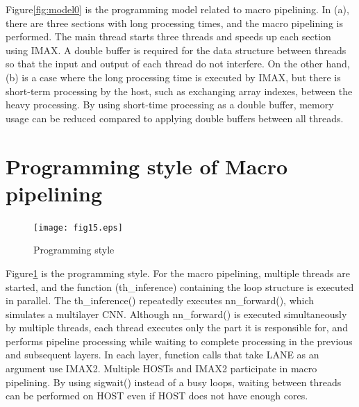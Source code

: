 Figure\ref{fig:model0} is the programming model related to macro pipelining. 
In (a), there are three sections with long processing times, and the macro
pipelining is performed. The main thread starts three threads and speeds up
each section using IMAX. A double buffer is required for the data structure
between threads so that the input and output of each thread do not
interfere. On the other hand, (b) is a case where the long processing time
is executed by IMAX, but there is short-term processing by the host, such as
exchanging array indexes, between the heavy processing. By using short-time
processing as a double buffer, memory usage can be reduced compared to
applying double buffers between all threads.

\section{Programming style of Macro pipelining}

\begin{figure}[htbp]
\center
\texttt{[image: fig15.eps]}
\caption{\label{fig:model1}Programming style}
\end{figure}

Figure\ref{fig:model1} is the programming style. For the macro pipelining,
multiple threads are started, and the function (th\_inference) containing
the loop structure is executed in parallel. The th\_inference() repeatedly
executes nn\_forward(), which simulates a multilayer CNN. Although
nn\_forward() is executed simultaneously by multiple threads, each thread
executes only the part it is responsible for, and performs pipeline
processing while waiting to complete processing in the previous and
subsequent layers. In each layer, function calls that take LANE as an
argument use IMAX2. Multiple HOSTs and IMAX2 participate in macro
pipelining.  By using sigwait() instead of a busy loops, waiting between
threads can be performed on HOST even if HOST does not have enough cores.
